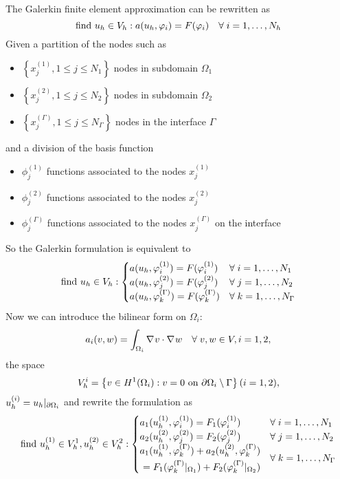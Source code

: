 The Galerkin finite element approximation can be rewritten as 
\[
    \text{find } u_h \in V_h : a(u_h,\varphi_i) = F(\varphi_i) \quad \forall \; i = 1,\ldots,N_h
\]
Given a partition of the nodes such as 
\begin{itemize}
    \item \(\left\{ x_j^{(1)}, 1\leq j \leq N_1 \right\}\) nodes in subdomain \(\Omega_1\)
    \item \(\left\{ x_j^{(2)}, 1\leq j \leq N_2 \right\}\) nodes in subdomain \(\Omega_2\)
    \item \(\left\{ x_j^{(\Gamma)}, 1\leq j \leq N_\Gamma \right\}\) nodes in the interface \(\Gamma\)
\end{itemize}
and a division of the basis function 
\begin{itemize}
    \item \(\phi_j^{(1)}\) functions associated to the nodes \(x_j^{(1)}\)
    \item \(\phi_j^{(2)}\) functions associated to the nodes \(x_j^{(2)}\)
    \item \(\phi_j^{(\Gamma)}\) functions associated to the nodes \(x_j^{(\Gamma)}\) on the interface
\end{itemize}
So the Galerkin formulation is equivalent to 
\[
    \text{find } u_h \in V_h :\begin{cases}
        a(u_h,\varphi_i^{(1)}) = F(\varphi_i^{(1)}) & \forall \; i = 1,\ldots, N_1 \\
        a(u_h,\varphi_j^{(2)}) = F(\varphi_j^{(2)}) & \forall \; j = 1,\ldots, N_2 \\
        a(u_h,\varphi_k^{(\Gamma)}) = F(\varphi_k^{(\Gamma)}) & \forall \; k = 1,\ldots, N_\Gamma
    \end{cases}
\]
Now we can introduce the bilinear form on \(\Omega_i\):
\[
    a_i (v,w) = \int_{\Omega_i} \nabla\mspace{1mu} v \cdot \nabla\mspace{1mu} w \quad \forall \; v,w \in V, i = 1,2,
\]
the space 
\[
    V_{h}^i = \left\{ v \in H^1(\Omega_i) : v = 0 \text{ on } {\partial\Omega}_i\setminus \Gamma \right\} (i=1,2),
\]
\(u_h^{(i)} = u_h\vert_{{\partial\Omega}_i}\) and rewrite the formulation as 
\[
    \text{find } u_h^{(1)} \in V_h^1, u_h^{(2)} \in V_h^2 : \begin{cases}
        a_1(u_h^{(1)},\varphi_i^{(1)}) = F_1(\varphi_i^{(1)}) & \forall \; i = 1,\ldots, N_1 \\
        a_2(u_h^{(2)},\varphi_j^{(2)}) = F_2(\varphi_j^{(2)}) & \forall \; j = 1,\ldots, N_2 \\
        \begin{aligned}
            a_1(u_h^{(1)},\varphi_k^{(\Gamma)}) + a_2(u_h^{(2)},\varphi_k^{(\Gamma)}) \\ = F_1(\varphi_k^{(\Gamma)}\vert_{\Omega_1}) + F_2(\varphi_k^{(\Gamma)}\vert_{\Omega_2})
        \end{aligned} & \forall \; k = 1,\ldots, N_\Gamma
    \end{cases}
\]
